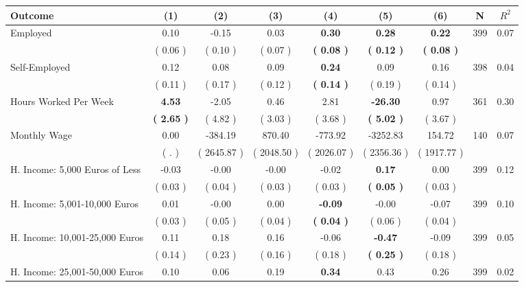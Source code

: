 \begin{tabular}{lcccccccc}
\toprule
 \textbf{Outcome} & \textbf{(1)} & \textbf{(2)} & \textbf{(3)} & \textbf{(4)} & \textbf{(5)} & \textbf{(6)} & \textbf{N} & \textbf{$ R^2$} \\
\midrule
Employed &      0.10 &     -0.15 &      0.03 & \textbf{     0.30} & \textbf{     0.28} & \textbf{     0.22} & 399 &       0.07 \\ 
 & (     0.06 ) & (     0.10 ) & (     0.07 ) & \textbf{(     0.08 )} & \textbf{(     0.12 )} & \textbf{(     0.08 )} & \\
Self-Employed &      0.12 &      0.08 &      0.09 & \textbf{     0.24} &      0.09 &      0.16 & 398 &       0.04 \\ 
 & (     0.11 ) & (     0.17 ) & (     0.12 ) & \textbf{(     0.14 )} & (     0.19 ) & (     0.14 ) & \\
Hours Worked Per Week & \textbf{     4.53} &     -2.05 &      0.46 &      2.81 & \textbf{   -26.30} &      0.97 & 361 &       0.30 \\ 
 & \textbf{(     2.65 )} & (     4.82 ) & (     3.03 ) & (     3.68 ) & \textbf{(     5.02 )} & (     3.67 ) & \\
Monthly Wage &      0.00 &   -384.19 &    870.40 &   -773.92 &  -3252.83 &    154.72 & 140 &       0.07 \\ 
 & (        . ) & (  2645.87 ) & (  2048.50 ) & (  2026.07 ) & (  2356.36 ) & (  1917.77 ) & \\
H. Income: 5,000 Euros of Less &     -0.03 &     -0.00 &     -0.00 &     -0.02 & \textbf{     0.17} &      0.00 & 399 &       0.12 \\ 
 & (     0.03 ) & (     0.04 ) & (     0.03 ) & (     0.03 ) & \textbf{(     0.05 )} & (     0.03 ) & \\
H. Income: 5,001-10,000 Euros &      0.01 &     -0.00 &      0.00 & \textbf{    -0.09} &     -0.00 &     -0.07 & 399 &       0.10 \\ 
 & (     0.03 ) & (     0.05 ) & (     0.04 ) & \textbf{(     0.04 )} & (     0.06 ) & (     0.04 ) & \\
H. Income: 10,001-25,000 Euros &      0.11 &      0.18 &      0.16 &     -0.06 & \textbf{    -0.47} &     -0.09 & 399 &       0.05 \\ 
 & (     0.14 ) & (     0.23 ) & (     0.16 ) & (     0.18 ) & \textbf{(     0.25 )} & (     0.18 ) & \\
H. Income: 25,001-50,000 Euros &      0.10 &      0.06 &      0.19 & \textbf{     0.34} &      0.43 &      0.26 & 399 &       0.02 \\ 

\end{tabular}
